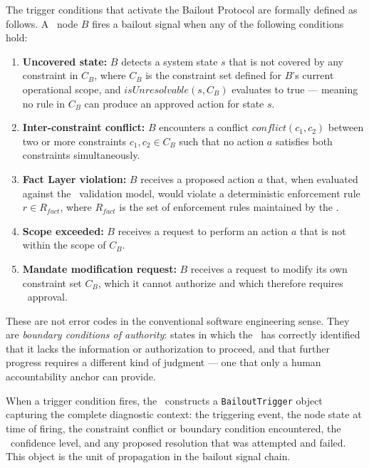 The trigger conditions that activate the Bailout Protocol are formally defined as follows. A \bounds\ node $B$ fires a bailout signal when any of the following conditions hold:

\begin{enumerate}
\item \textbf{Uncovered state:} $B$ detects a system state $s$ that is not covered by any constraint in $C_B$, where $C_B$ is the constraint set defined for $B$'s current operational scope, and $isUnresolvable(s, C_B)$ evaluates to true --- meaning no rule in $C_B$ can produce an approved action for state $s$.

\item \textbf{Inter-constraint conflict:} $B$ encounters a conflict $conflict(c_1, c_2)$ between two or more constraints $c_1, c_2 \in C_B$ such that no action $a$ satisfies both constraints simultaneously.

\item \textbf{Fact Layer violation:} $B$ receives a proposed action $a$ that, when evaluated against the \fact\ validation model, would violate a deterministic enforcement rule $r \in R_{fact}$, where $R_{fact}$ is the set of enforcement rules maintained by the \fact.

\item \textbf{Scope exceeded:} $B$ receives a request to perform an action $a$ that is not within the scope of $C_B$.

\item \textbf{Mandate modification request:} $B$ receives a request to modify its own constraint set $C_B$, which it cannot authorize and which therefore requires \purpose\ approval.
\end{enumerate}

These are not error codes in the conventional software engineering sense. They are \textit{boundary conditions of authority}: states in which the \bounds\ has correctly identified that it lacks the information or authorization to proceed, and that further progress requires a different kind of judgment --- one that only a human accountability anchor can provide.

When a trigger condition fires, the \bounds\ constructs a \texttt{BailoutTrigger} object capturing the complete diagnostic context: the triggering event, the node state at time of firing, the constraint conflict or boundary condition encountered, the \bounds\ confidence level, and any proposed resolution that was attempted and failed. This object is the unit of propagation in the bailout signal chain.


